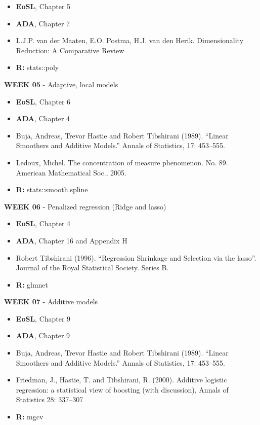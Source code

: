 \documentclass[12pt]{article}
\begin{document}
\begin{itemize}\setlength\itemsep{0em}
\item \textbf{EoSL}, Chapter 5
\item \textbf{ADA}, Chapter 7
\item L.J.P. van der Maaten, E.O. Postma, H.J. van den Herik. Dimensionality Reduction: A Comparative Review
\item \textbf{R:} stats::poly
\end{itemize}

\vspace{0.2cm}

\textbf{WEEK 05} - Adaptive, local models

\begin{itemize}\setlength\itemsep{0em}
\item \textbf{EoSL}, Chapter 6
\item \textbf{ADA}, Chapter 4
\item Buja, Andreas, Trevor Hastie and Robert Tibshirani (1989).
“Linear Smoothers and Additive Models.” Annals of Statistics, 17: 453–555.
\item Ledoux, Michel. The concentration of measure phenomenon. No. 89. American Mathematical Soc., 2005.
\item \textbf{R:} stats::smooth.spline
\end{itemize}

\vspace{0.2cm}

\textbf{WEEK 06} - Penalized regression (Ridge and lasso)

\begin{itemize}\setlength\itemsep{0em}
\item \textbf{EoSL}, Chapter 4
\item \textbf{ADA}, Chapter 16 and Appendix H
\item Robert Tibshirani (1996). ``Regression Shrinkage and Selection via
the lasso''. Journal of the Royal Statistical Society. Series B.
\item \textbf{R:} glmnet
\end{itemize}

\vspace{0.2cm}

\textbf{WEEK 07} - Additive models

\begin{itemize}\setlength\itemsep{0em}
\item \textbf{EoSL}, Chapter 9
\item \textbf{ADA}, Chapter 9
\item Buja, Andreas, Trevor Hastie and Robert Tibshirani (1989). “Linear Smoothers and Additive Models.” Annals of Statistics, 17: 453–555.
\item Friedman, J., Hastie, T. and Tibshirani, R. (2000). Additive logistic regression: a statistical view of boosting (with discussion), Annals of Statistics 28: 337–307
\item \textbf{R:} mgcv
\end{itemize}
\end{document}
